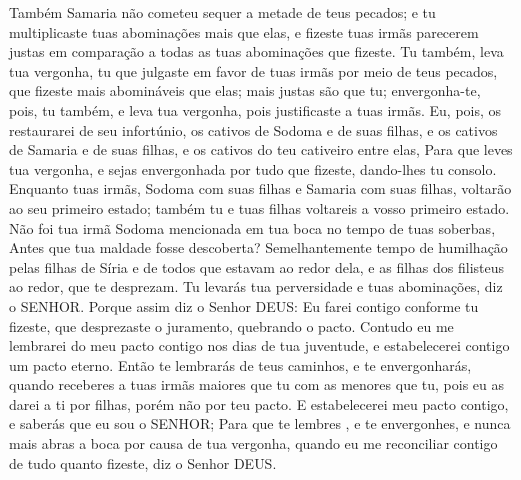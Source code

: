 {
  Também Samaria não cometeu sequer a metade de teus pecados; e tu multiplicaste tuas abominações mais que elas, e fizeste tuas irmãs parecerem justas em comparação a todas as tuas abominações que fizeste.
  Tu também, leva tua vergonha, tu que julgaste em favor de tuas irmãs por meio de teus pecados, que fizeste mais abomináveis que elas; mais justas são que tu; envergonha-te, pois, tu também, e leva tua vergonha, pois justificaste a tuas irmãs.
  Eu, pois, os restaurarei de seu infortúnio, os cativos de Sodoma e de suas filhas, e os cativos de Samaria e de suas filhas, e os cativos do teu cativeiro entre elas,
  Para que leves tua vergonha, e sejas envergonhada por tudo que fizeste, dando-lhes tu consolo.
  Enquanto tuas irmãs, Sodoma com suas filhas e Samaria com suas filhas, voltarão ao seu primeiro estado; também tu e tuas filhas voltareis a vosso primeiro estado.
  Não foi tua irmã Sodoma mencionada em tua boca no tempo de tuas soberbas,
  Antes que tua maldade fosse descoberta? Semelhantemente
{} tempo de humilhação pelas filhas de Síria e de todos que estavam ao redor dela, e as filhas dos filisteus ao redor, que te desprezam.
  Tu levarás
{} tua perversidade e tuas abominações, diz o SENHOR.
  Porque assim diz o Senhor DEUS: Eu farei contigo conforme tu fizeste, que desprezaste o juramento, quebrando o pacto.
  Contudo eu me lembrarei do meu pacto contigo nos dias de tua juventude, e estabelecerei contigo um pacto eterno.
  Então te lembrarás de teus caminhos, e te envergonharás, quando receberes a tuas irmãs maiores que tu com as menores que tu, pois eu as darei a ti por filhas, porém não por teu pacto.
  E estabelecerei meu pacto contigo, e saberás que eu sou o SENHOR;
  Para que te lembres
{},  e te envergonhes, e nunca mais abras a boca por causa de tua vergonha, quando eu me reconciliar contigo de tudo quanto fizeste, diz o Senhor DEUS.
\par }

